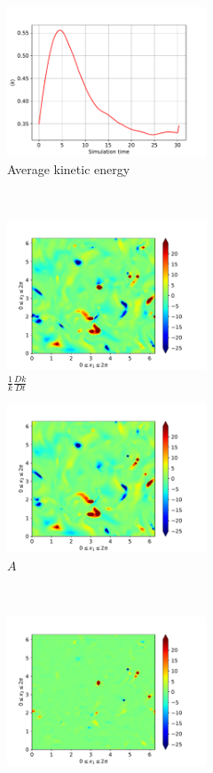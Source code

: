 \newpage

\begin{figure}[H]
    \begin{subfigure}[H]{0.45\textwidth}
        \includegraphics[height=1.75in]{media/run-cds-65/ke-average1360}
        \caption{Average kinetic energy}
    \end{subfigure}
    ~
    \begin{subfigure}[H]{0.45\textwidth}
        \includegraphics[height=1.75in]{media/run-cds-65/ke-1360}
        \caption{$\frac{1}{k} \frac{D k}{Dt}$}
    \end{subfigure}
    \newline
    \begin{subfigure}{0.45\textwidth}
        \includegraphics[height=1.75in]{media/run-cds-65/A-ke-1360}
        \caption{$A$}
    \end{subfigure}
    ~
    \begin{subfigure}{0.45\textwidth}
        \includegraphics[height=1.75in]{media/run-cds-65/C-ke-1360}

\end{subfigure}
\end{figure}
